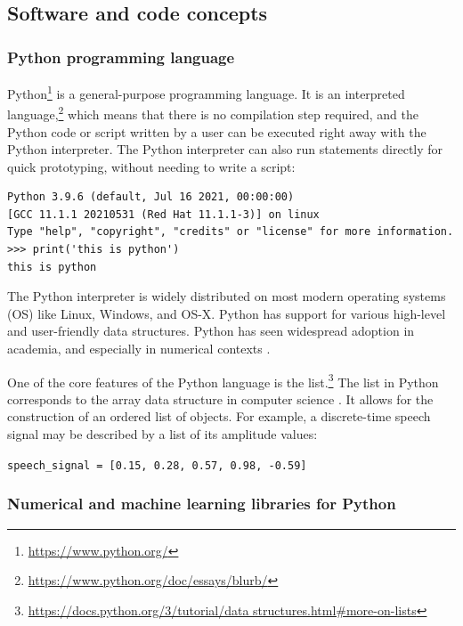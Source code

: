 \documentclass[report.tex]{subfiles}
\begin{document}
\newpagefill

\subsection{Software and code concepts}
\label{sec:softcode}

\subsubsection{Python programming language}
\label{sec:pythonbasics}

Python\footnote{\url{https://www.python.org/}} is a general-purpose programming language. It is an interpreted language,\footnote{\url{https://www.python.org/doc/essays/blurb/}} which means that there is no compilation step required, and the Python code or script written by a user can be executed right away with the Python interpreter. The Python interpreter can also run statements directly for quick prototyping, without needing to write a script:

\begin{listing}[!ht]
\centering
\begin{BVerbatim}
Python 3.9.6 (default, Jul 16 2021, 00:00:00)
[GCC 11.1.1 20210531 (Red Hat 11.1.1-3)] on linux
Type "help", "copyright", "credits" or "license" for more information.
>>> print('this is python')
this is python
\end{BVerbatim}
\end{listing}

The Python interpreter is widely distributed on most modern operating systems (OS) like Linux, Windows, and OS-X. Python has support for various high-level and user-friendly data structures. Python has seen widespread adoption in academia, and especially in numerical contexts \parencite{pythonscience}.

One of the core features of the Python language is the list.\footnote{\url{https://docs.python.org/3/tutorial/data structures.html\#more-on-lists}} The list in Python corresponds to the array data structure in computer science \parencite{skiena}. It allows for the construction of an ordered list of objects. For example, a discrete-time speech signal may be described by a list of its amplitude values:

\hfill \Verb#speech_signal = [0.15, 0.28, 0.57, 0.98, -0.59]#

\subsubsection{Numerical and machine learning libraries for Python}
\end{document}
